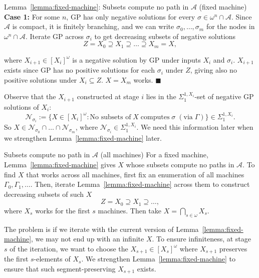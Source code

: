 \begin{frame}{Lemma~\ref{lemma:fixed-machine}: Subsets compute no path in
$\mathcal{A}$ (fixed machine)}
  \textbf{Case 1:} For some $n$, GP has only negative solutions for every
  $\sigma\in\omega^n\cap\mathcal{A}$. Since $\mathcal{A}$ is compact, it is
  finitely branching, and we can write $\sigma_0,\ldots,\sigma_m$ for the
  nodes in $\omega^n\cap\mathcal{A}$. Iterate GP across $\sigma_i$ to get
  decreasing subsets of negative solutions
  \[Z=X_0 \supseteq X_1 \supseteq \ldots\supseteq X_m=X,\]

  where $X_{i+1}\in[X_i]^\omega$ is a negative solution by GP under
  inputs $X_i$ and $\sigma_i$. $X_{i+1}$ exists since GP has no positive
  solutions for each $\sigma_i$ under $Z$, giving also no
  positive solutions under $X_i\subseteq Z$. $X=X_m$ works. $\blacksquare$

  \vspace{0.5em}
  Observe that the $X_{i+1}$ constructed at stage $i$ lies in the
  $\Sigma_1^{1,X_i}$-set of negative GP solutions of $X_i$:
  \[\mathcal{N}_{\sigma_i}:= \{X\in[X_i]^\omega: \text{No subsets of}\; X\;
  \text{computes}\; \sigma\; (\text{via}\; \Gamma)\}
  \in\Sigma_1^{1,X_i}.\]
  So $X \in\mathcal{N}_{\sigma_0}\cap\ldots\cap\mathcal{N}_{\sigma_m}$,
  where $\mathcal{N}_{\sigma_i}\in\Sigma_1^{1,X_i}$. We need this
  information later when we strengthen Lemma~\ref{lemma:fixed-machine}
  later.
\end{frame}

\begin{frame}{Subsets compute no path in $\mathcal{A}$ (all
machines)}
  For a fixed machine, Lemma~\ref{lemma:fixed-machine} gives $X$ whose
  subsets compute no paths in $\mathcal{A}$. To find $X$ that works across
  all machines, first fix an enumeration of all machines
  $\Gamma_0,\Gamma_1,\ldots$. Then, iterate Lemma~\ref{lemma:fixed-machine}
  across them to construct decreasing subsets of such $X$
  \[Z= X_0\supseteq X_1\supseteq \ldots,\]
  where $X_s$ works for the first $s$ machines. Then take
  $X=\bigcap_{s\in\omega}X_s$.

  \vspace{1em}
  The problem is if we iterate with the current version of
  Lemma~\ref{lemma:fixed-machine}, we may not end up with an infinite $X$.
  To ensure infiniteness, at stage $s$ of the iteration, we want to choose
  the $X_{s+1}\in[X_s]^\omega$ where $X_{s+1}$ preserves the first
  $s$-elements of $X_s$. We strengthen Lemma~\ref{lemma:fixed-machine} to
  ensure that such segment-preserving $X_{s+1}$ exists.
\end{frame}


